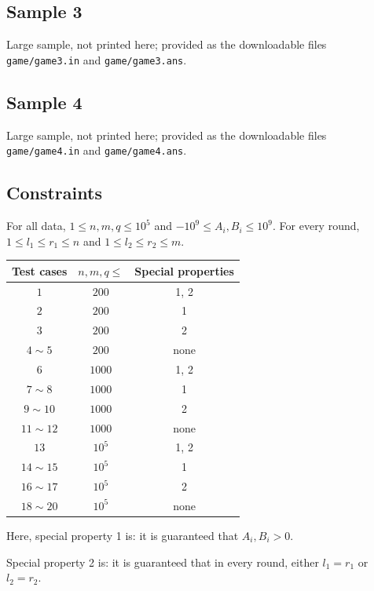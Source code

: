 \documentclass[11pt]{article}
\begin{document}
\subsection*{Sample 3}

Large sample, not printed here;
provided as the downloadable files \texttt{game/game3.in} and \texttt{game/game3.ans}.

\subsection*{Sample 4}

Large sample, not printed here;
provided as the downloadable files \texttt{game/game4.in} and \texttt{game/game4.ans}.

\subsection*{Constraints}

For all data, $1 \le n, m, q \le 10^5$
and $-10^9 \le A_i, B_i \le 10^9$.
For every round, $1 \le l_1 \le r_1 \le n$
and $1 \le l_2 \le r_2 \le m$.

\begin{center}
\begin{tabular}{ccc}
\toprule
Test cases & $n, m, q \le$ & Special properties \\
\midrule
$1$ & $200$ & 1, 2 \\
$2$ & $200$ & 1 \\
$3$ & $200$ & 2 \\
$4 \sim 5$ & $200$ & none \\
$6$ & $1000$ & 1, 2 \\
$7 \sim 8$ & $1000$ & 1 \\
$9 \sim 10$ & $1000$ & 2 \\
$11 \sim 12$ & $1000$ & none \\
$13$ & $10^5$ & 1, 2 \\
$14 \sim 15$ & $10^5$ & 1 \\
$16 \sim 17$ & $10^5$ & 2 \\
$18 \sim 20$ & $10^5$ & none \\
\bottomrule
\end{tabular}
\end{center}

Here, special property 1 is: it is guaranteed that $A_i, B_i > 0$.

Special property 2 is: it is guaranteed that in every round,
either $l_1 = r_1$ or $l_2 = r_2$.
\end{document}
